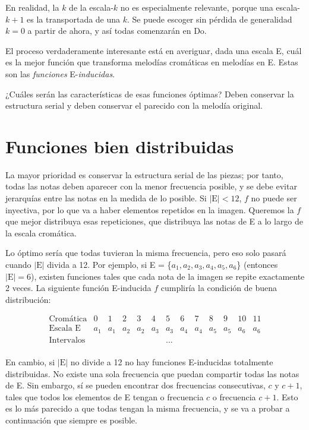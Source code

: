 		En realidad, la $k$ de la escala-$k$ no es especialmente relevante, porque una escala-$k+1$ es la transportada de una $k$. Se puede escoger sin pérdida de generalidad $k=0$ a partir de ahora, y así todas comenzarán en Do.
		
		El proceso verdaderamente interesante está en averiguar, dada una escala E, cuál es la mejor función que transforma melodías cromáticas en melodías en E. Estas son las \textit{funciones} E-\textit{inducidas}.
		
		¿Cuáles serán las características de esas funciones óptimas? Deben conservar la estructura serial y deben conservar el parecido con la melodía original.
		
	\section{Funciones bien distribuidas}
		
		La mayor prioridad es conservar la estructura serial de las piezas; por tanto, todas las notas deben aparecer con la menor frecuencia posible, y se debe evitar jerarquías entre las notas en la medida de lo posible. Si $|\text{E}|<12$, $f$ no puede ser inyectiva, por lo que va a haber elementos repetidos en la imagen. Queremos la $f$ que mejor distribuya esas repeticiones, que distribuya las notas de E a lo largo de la escala cromática.
		
		Lo óptimo sería que todas tuvieran la misma frecuencia, pero eso solo pasará cuando $|\text{E}|$ divida a 12. Por ejemplo, si E = \{$a_1,a_2,a_3,a_4,a_5,a_6$\} (entonces $|\text{E}|=6$), existen funciones tales que cada nota de la imagen se repite exactamente 2 veces. La siguiente función E-inducida $f$ cumpliría la condición de buena distribución:
				
		$$\left.\begin{matrix}
		\text{Cromática}&0&1&2&3&4&5&6&7&8&9&10&11\\
		\text{Escala E}&a_1&a_1&a_2&a_2&a_3&a_3&a_4&a_4&a_5&a_5&a_6&a_6\\
		\text{Intervalos}&&&&&&\ldots\\
		\end{matrix}\right.$$
		
		En cambio, si $|\text{E}|$ no divide a 12 no hay funciones E-inducidas totalmente distribuidas. No existe una sola frecuencia que puedan compartir todas las notas de E. Sin embargo, sí se pueden encontrar dos frecuencias consecutivas, $c$ y $c+1$, tales que todos los elementos de E tengan o frecuencia $c$ o frecuencia $c+1$. Esto es lo más parecido a que todas tengan la misma frecuencia, y se va a probar a continuación que siempre es posible. 
		
